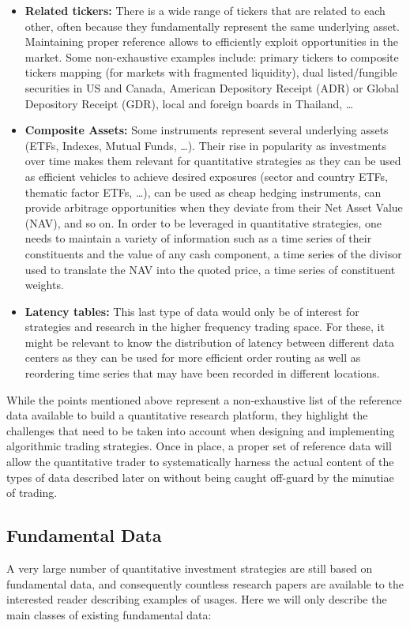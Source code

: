 \begin{itemize}
\item \textbf{Related tickers:} There is a wide range of tickers that are related to each other, often because they fundamentally represent the same underlying asset. Maintaining proper reference allows to efficiently exploit opportunities in the market. Some non-exhaustive examples include: primary tickers to composite tickers mapping (for markets with fragmented liquidity), dual listed/fungible securities in US and Canada, American Depository Receipt (ADR) or Global Depository Receipt (GDR), local and foreign boards in Thailand, \dots 


\item \textbf{Composite Assets:} Some instruments represent several underlying assets (ETFs, Indexes, Mutual Funds, \dots). Their rise in popularity as investments over time makes them relevant for quantitative strategies as they can be used as efficient vehicles to achieve desired exposures (sector and country ETFs, thematic factor ETFs, \dots), can be used as cheap hedging instruments, can provide arbitrage opportunities when they deviate from their Net Asset Value (NAV), and so on. 
In order to be leveraged in quantitative strategies, one needs to maintain a variety of information such as a time series of their constituents and the value of any cash component, a time series of the divisor used to translate the NAV into the quoted price, a time series of constituent weights. 


\item \textbf{Latency tables:} This last type of data would only be of interest for strategies and research in the higher frequency trading space. For these, it might be relevant to know the distribution of latency between different data centers as they can be used for more efficient order routing as well as reordering time series that may have been recorded in different locations.
\end{itemize}


While the points mentioned above represent a non-exhaustive list of the reference data available to build a quantitative research platform, they highlight the challenges that need to be taken into account when designing and implementing algorithmic trading strategies. Once in place, a proper set of reference data will allow the quantitative trader to systematically harness the actual content of the types of data described later on without being caught off-guard by the minutiae of trading.\\

\subsection{Fundamental Data}
A very large number of quantitative investment strategies are still based on fundamental data, and consequently countless research papers are available to the interested reader describing examples of usages. Here we will only describe the main classes of existing fundamental data:

